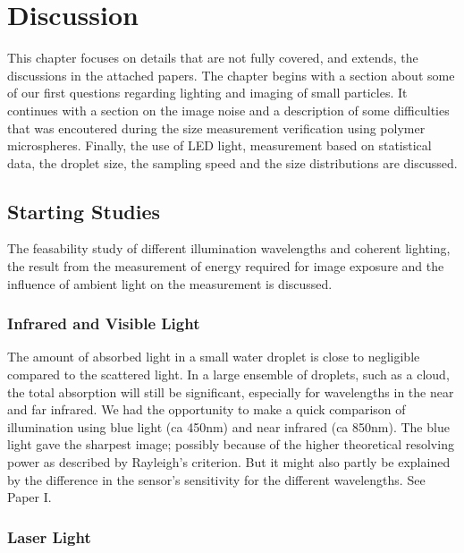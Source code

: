 
\chapter{Discussion}
\label{chap:discussion}

This chapter focuses on details that are not fully covered, and extends, the discussions in the attached papers. The chapter begins with a section about some of our first questions regarding lighting and imaging of small particles. It continues with a section on the image noise and a description of some difficulties that was encoutered during the size measurement verification using polymer microspheres. Finally, the use of LED light, measurement based on statistical data, the droplet size, the sampling speed and the size distributions are discussed.

\section{Starting Studies}
\label{sec:discussionstarting}

The feasability study of different illumination wavelengths and coherent lighting, the result from the measurement of energy required for image exposure and the influence of ambient light on the measurement is discussed.

\subsection{Infrared and Visible Light}

The amount of absorbed light in a small water droplet is close to negligible compared to the scattered light. In a large ensemble of droplets, such as a cloud, the total absorption will still be significant, especially for wavelengths in the near and far infrared. We had the opportunity to make a quick comparison of illumination using blue light (ca 450nm) and near infrared (ca 850nm). The blue light gave the sharpest image; possibly because of the higher theoretical resolving power as described by Rayleigh's criterion. But it might also partly be explained by the difference in the sensor's sensitivity for the different wavelengths. See Paper I.

\subsection{Laser Light}
\label{sec:discussionlaser}

